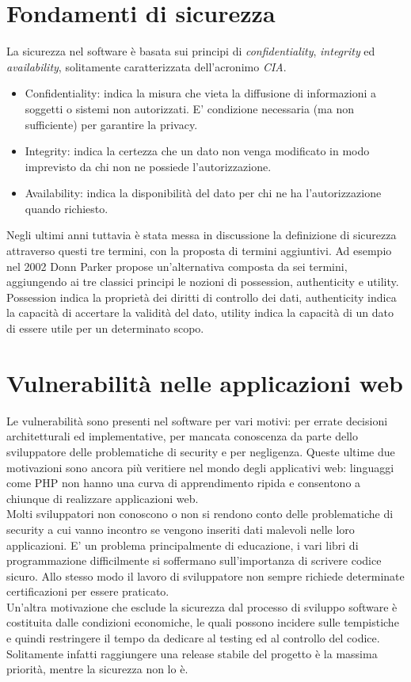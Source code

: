 \section{Fondamenti di sicurezza}
La sicurezza nel software è basata sui principi di \emph{confidentiality}, \emph{integrity} ed \emph{availability}, solitamente caratterizzata dell'acronimo \emph{CIA}.\\
\begin{itemize}
\item Confidentiality: indica la misura che vieta la diffusione di informazioni a soggetti o sistemi non autorizzati. E' condizione necessaria (ma non sufficiente) per garantire la privacy.
\item Integrity: indica la certezza che un dato non venga modificato in modo imprevisto da chi non ne possiede l'autorizzazione.
\item Availability: indica la disponibilità del dato per chi ne ha l'autorizzazione quando richiesto.
\end{itemize}
Negli ultimi anni tuttavia è stata messa in discussione la definizione di sicurezza attraverso questi tre termini, con la proposta di termini aggiuntivi. Ad esempio nel 2002 Donn Parker\cite{CITAZIONE} propose un'alternativa composta da sei termini, aggiungendo ai tre classici principi le nozioni di possession, authenticity e utility.
Possession indica la proprietà dei diritti di controllo dei dati, authenticity indica la capacità di accertare la validità del dato, utility indica la capacità di un dato di essere utile per un determinato scopo.

\section{Vulnerabilità nelle applicazioni web}
Le vulnerabilità sono presenti nel software per vari motivi: per errate decisioni architetturali ed implementative, per mancata conoscenza da parte dello sviluppatore delle problematiche di security e per negligenza. Queste ultime due motivazioni sono ancora più veritiere nel mondo degli applicativi web: linguaggi come PHP non hanno una curva di apprendimento ripida e consentono a chiunque di realizzare applicazioni web.\\
Molti sviluppatori non conoscono o non si rendono conto delle problematiche di security a cui vanno incontro se vengono inseriti dati malevoli nelle loro applicazioni. E' un problema principalmente di educazione, i vari libri di programmazione difficilmente si soffermano sull'importanza di scrivere codice sicuro. Allo stesso modo il lavoro di sviluppatore non sempre richiede determinate certificazioni per essere praticato.\\
Un'altra motivazione che esclude la sicurezza dal processo di sviluppo software è costituita dalle condizioni economiche, le quali possono incidere sulle tempistiche e quindi restringere il tempo da dedicare al testing ed al controllo del codice. Solitamente infatti raggiungere una release stabile del progetto è la massima priorità, mentre la sicurezza non lo è.\\

